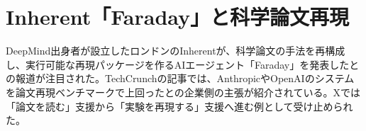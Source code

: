 \section{Inherent「Faraday」と科学論文再現}
DeepMind出身者が設立したロンドンのInherentが、科学論文の手法を再構成し、実行可能な再現パッケージを作るAIエージェント「Faraday」を発表したとの報道が注目された。TechCrunchの記事では、AnthropicやOpenAIのシステムを論文再現ベンチマークで上回ったとの企業側の主張が紹介されている。Xでは「論文を読む」支援から「実験を再現する」支援へ進む例として受け止められた。

